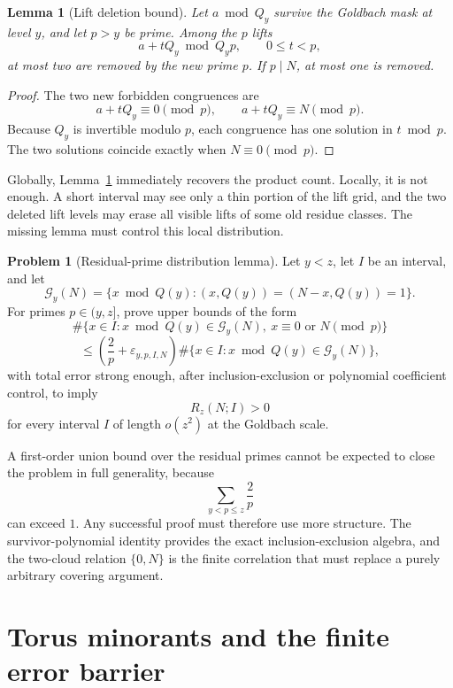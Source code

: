 \documentclass[11pt]{article}
\theoremstyle{plain}
\newtheorem{lemma}[theorem]{Lemma}
\theoremstyle{definition}
\newtheorem{problem}[theorem]{Problem}
\theoremstyle{remark}
\newcommand{\G}{\mathcal G}
\begin{document}
\begin{lemma}[Lift deletion bound]
\label{lem:lift_deletion}
Let \(a\bmod Q_y\) survive the Goldbach mask at level \(y\), and let \(p>y\) be
prime.  Among the \(p\) lifts
\[
a+tQ_y\bmod Q_y p,
\qquad 0\le t<p,
\]
at most two are removed by the new prime \(p\).  If \(p\mid N\), at most one is
removed.
\end{lemma}

\begin{proof}
The two new forbidden congruences are
\[
a+tQ_y\equiv0\pmod p,
\qquad
 a+tQ_y\equiv N\pmod p.
\]
Because \(Q_y\) is invertible modulo \(p\), each congruence has one solution in
\(t\bmod p\).  The two solutions coincide exactly when \(N\equiv0\pmod p\).
\end{proof}

Globally, Lemma~\ref{lem:lift_deletion} immediately recovers the product count.
Locally, it is not enough.  A short interval may see only a thin portion of the
lift grid, and the two deleted lift levels may erase all visible lifts of some
old residue classes.  The missing lemma must control this local distribution.

\begin{problem}[Residual-prime distribution lemma]
\label{prob:distribution_lemma}
Let \(y<z\), let \(I\) be an interval, and let
\[
\G_y(N)=\{x\bmod Q(y):(x,Q(y))=(N-x,Q(y))=1\}.
\]
For primes \(p\in(y,z]\), prove upper bounds of the form
\[
\#\{x\in I:x\bmod Q(y)\in\G_y(N),\ x\equiv0\text{ or }N\pmod p\}
\]
\[
\le
\left(\frac{2}{p}+\varepsilon_{y,p,I,N}\right)
\#\{x\in I:x\bmod Q(y)\in\G_y(N)\},
\]
with total error strong enough, after inclusion-exclusion or polynomial
coefficient control, to imply
\[
R_z(N;I)>0
\]
for every interval \(I\) of length \(o(z^2)\) at the Goldbach scale.
\end{problem}

A first-order union bound over the residual primes cannot be expected to close
the problem in full generality, because
\[
\sum_{y<p\le z}\frac{2}{p}
\]
can exceed \(1\).  Any successful proof must therefore use more structure.  The
survivor-polynomial identity provides the exact inclusion-exclusion algebra, and
the two-cloud relation \(\{0,N\}\) is the finite correlation that must replace a
purely arbitrary covering argument.


\section{Torus minorants and the finite error barrier}
\label{sec:minorants}
\end{document}
